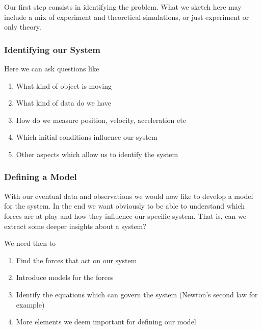 \documentclass[letterpaper,10pt,english]{sphinxmanual}
\begin{document}
Our first step consists in identifying the problem. What we sketch
here may include a mix of experiment and theoretical simulations, or
just experiment or only theory.


\subsubsection{Identifying our System}
\label{\detokenize{chapter3:identifying-our-system}}
Here we can ask questions like
\begin{enumerate}
%
\item {} 
What kind of object is moving

\item {} 
What kind of data do we have

\item {} 
How do we measure position, velocity, acceleration etc

\item {} 
Which initial conditions influence our system

\item {} 
Other aspects which allow us to identify the system

\end{enumerate}


\subsubsection{Defining a Model}
\label{\detokenize{chapter3:defining-a-model}}
With our eventual data and observations we would now like to develop a
model for the system. In the end we want obviously to be able to
understand which forces are at play and how they influence our
specific system. That is, can we extract some deeper insights about a
system?

We need then to
\begin{enumerate}
%
\item {} 
Find the forces that act on our system

\item {} 
Introduce models for the forces

\item {} 
Identify the equations which can govern the system (Newton’s second law for example)

\item {} 
More elements we deem important for defining our model

\end{enumerate}
\end{document}
